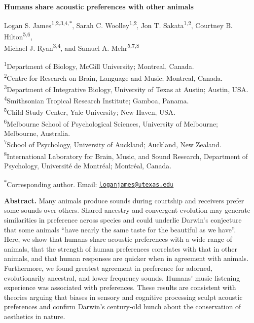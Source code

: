 \documentclass[
]{article}
\author{}
\date{\vspace{-2.5em}}
\begin{document}
\centering
\LARGE

\textbf{Humans share acoustic preferences with other animals}

\vspace{4mm}

\normalsize

Logan S. James\textsuperscript{1,2,3,4,\(\ast\)}, Sarah C.
Woolley\textsuperscript{1,2}, Jon T. Sakata\textsuperscript{1,2},
Courtney B. Hilton\textsuperscript{5,6},\\
Michael J. Ryan\textsuperscript{3,4}, and Samuel A.
Mehr\textsuperscript{5,7,8}

\footnotesize

\textsuperscript{1}Department of Biology, McGill University; Montreal,
Canada.\\
\textsuperscript{2}Centre for Research on Brain, Language and Music;
Montreal, Canada.\\
\textsuperscript{3}Department of Integrative Biology, University of
Texas at Austin; Austin, USA.\\
\textsuperscript{4}Smithsonian Tropical Research Institute; Gamboa,
Panama.\\
\textsuperscript{5}Child Study Center, Yale University; New Haven,
USA.\\
\textsuperscript{6}Melbourne School of Psychological Sciences,
University of Melbourne; Melbourne, Australia.\\
\textsuperscript{7}School of Psychology, University of Auckland;
Auckland, New Zealand.\\
\textsuperscript{8}International Laboratory for Brain, Music, and Sound
Research, Department of Psychology, Université de Montréal; Montréal,
Canada.

\textsuperscript{\(\ast\)}Corresponding author. Email:
\href{mailto:loganjames@utexas.edu}{\nolinkurl{loganjames@utexas.edu}}

\vspace{4mm}
\raggedright
\normalsize

\textbf{Abstract.} Many animals produce sounds during courtship and
receivers prefer some sounds over others. Shared ancestry and convergent
evolution may generate similarities in preference across species and
could underlie Darwin's conjecture that some animals ``have nearly the
same taste for the beautiful as we have''. Here, we show that humans
share acoustic preferences with a wide range of animals, that the
strength of human preferences correlates with that in other animals, and
that human responses are quicker when in agreement with animals.
Furthermore, we found greatest agreement in preference for adorned,
evolutionarily ancestral, and lower frequency sounds. Humans' music
listening experience was associated with preferences. These results are
consistent with theories arguing that biases in sensory and cognitive
processing sculpt acoustic preferences and confirm Darwin's century-old
hunch about the conservation of aesthetics in nature.
\end{document}
